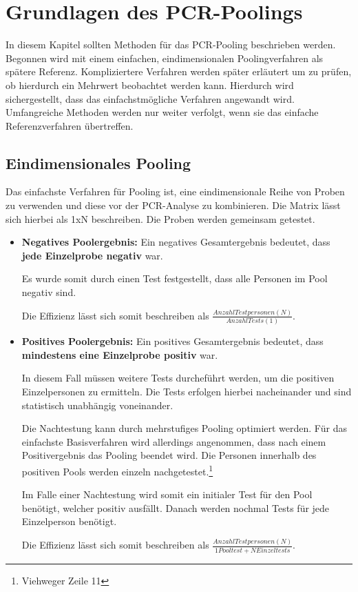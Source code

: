 \cleardoublepage
\chapter{Grundlagen des PCR-Poolings}
In diesem Kapitel sollten Methoden für das PCR-Pooling beschrieben werden.
Begonnen wird mit einem einfachen, eindimensionalen Poolingverfahren als spätere Referenz.
Kompliziertere Verfahren werden später erläutert um zu prüfen, ob hierdurch ein Mehrwert beobachtet werden kann.
Hierdurch wird sichergestellt, dass das einfachstmögliche Verfahren angewandt wird.
Umfangreiche Methoden werden nur weiter verfolgt, wenn sie das einfache Referenzverfahren übertreffen.

\section{Eindimensionales Pooling}
Das einfachste Verfahren für Pooling ist, eine eindimensionale Reihe von Proben zu verwenden und diese vor der PCR-Analyse zu kombinieren.
Die Matrix lässt sich hierbei als 1xN beschreiben.
Die Proben werden gemeinsam getestet.
\begin{itemize}
	\item \textbf{Negatives Poolergebnis:}\newline
	Ein negatives Gesamtergebnis bedeutet, dass \textbf{jede Einzelprobe negativ} war.
	
	Es wurde somit durch einen Test festgestellt, dass alle Personen im Pool negativ sind.
	
	Die Effizienz lässt sich somit beschreiben als $\frac{Anzahl Testpersonen (N)}{Anzahl Tests (1)} $.
	
	\item \textbf{Positives Poolergebnis:}\newline
	Ein positives Gesamtergebnis bedeutet, dass \textbf{mindestens eine Einzelprobe positiv} war.
	
	In diesem Fall müssen weitere Tests durcheführt werden, um die positiven Einzelpersonen zu ermitteln.
	Die Tests erfolgen hierbei nacheinander und sind statistisch unabhängig voneinander.
	
	Die Nachtestung kann durch mehrstufiges Pooling optimiert werden.
	Für das einfachste Basisverfahren wird allerdings angenommen, dass nach einem Positivergebnis das Pooling beendet wird.
	Die Personen innerhalb des positiven Pools werden einzeln nachgetestet.\footnote{Viehweger Zeile 11}
	
	Im Falle einer Nachtestung wird somit ein initialer Test für den Pool benötigt, welcher positiv ausfällt.
	Danach werden nochmal Tests für jede Einzelperson benötigt.
	
	Die Effizienz lässt sich somit beschreiben als $\frac{Anzahl Testpersonen (N)}{1 Pooltest + N Einzeltests} $.
\end{itemize}


